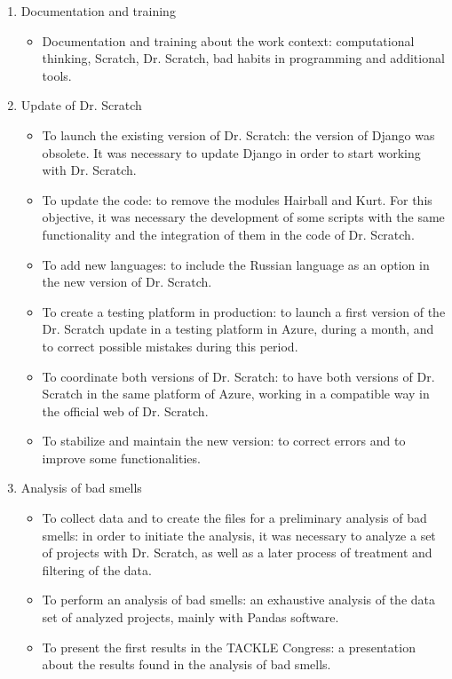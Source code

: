 \begin{enumerate}
    \item Documentation and training
    \begin{itemize}
        \item Documentation and training about the work context: computational thinking, Scratch, Dr. Scratch, bad habits in programming and additional tools.  
    \end{itemize}
    \item Update of Dr. Scratch
    \begin{itemize}
        \item To launch the existing version of Dr. Scratch: the version of Django was obsolete. It was necessary to update Django in order to start working with Dr. Scratch. 
        \item To update the code: to remove the modules Hairball and Kurt. For this objective, it was necessary the development of some scripts with the same functionality and the integration of them in the code of Dr. Scratch.
        \item To add new languages: to include the Russian language as an option in the new version of Dr. Scratch.
        \item To create a testing platform in production: to launch a first version of the Dr. Scratch update in a testing platform in Azure, during a month, and to correct possible mistakes during this period.
        \item To coordinate both versions of Dr. Scratch: to have both versions of Dr. Scratch in the same platform of Azure, working in a compatible way in the official web of Dr. Scratch.
        \item To stabilize and maintain the new version: to correct errors and to improve some functionalities.
    \end{itemize}
    \item Analysis of bad smells
    \begin{itemize}
         \item To collect data and to create the files for a preliminary analysis of bad smells: in order to initiate the analysis, it was necessary to analyze a set of projects with Dr. Scratch, as well as a later process of treatment and filtering of the data.
        \item To perform an analysis of bad smells: an exhaustive analysis of the data set of analyzed projects, mainly with Pandas software. 
        \item To present the first results in the TACKLE Congress: a presentation about the results found in the analysis of bad smells.

\end{itemize}
\end{enumerate}
